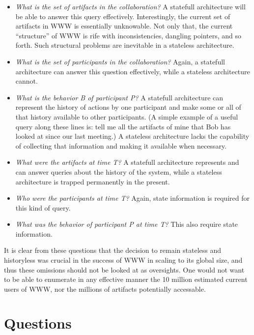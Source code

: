 \begin{itemize}
\item {\em What is the set of artifacts in the collaboration?}  A statefull
  architecture will be able to answer this query effectively.  Interestingly,
  the current set of artifacts in WWW is essentially unknowable. Not only
  that, the current ``structure'' of WWW is rife with inconsistencies,
  dangling pointers, and so forth.  Such structural problems are inevitable
  in a stateless architecture.

\item {\em What is the set of participants in the collaboration?}  Again,
  a statefull architecture can answer this question effectively, while a
  stateless architecture cannot.

\item {\em What is the behavior {\em B\/} of participant {\em P\/}?}  A
  statefull architecture can represent the history of actions by one
  participant and make some or all of that history available to other
  participants. (A simple example of a useful query along these lines is:
  tell me all the artifacts of mine that Bob has looked at since our last
  meeting.)  A stateless architecture lacks the capability of collecting
  that information and making it available when necessary.

\item {\em What were the artifacts at time {\em T\/}?} A statefull
  architecture represents and can answer queries about the history of the
  system, while a stateless architecture is trapped permanently in the
  present.

\item {\em Who were the participants at time {\em T\/}?}  Again, state
information is required for this kind of query.

\item {\em What was the behavior of participant {\em P\/} at time {\em T}?}
This also require state information.
\end{itemize}

It is clear from these questions that the decision to remain stateless and
historyless was crucial in the success of WWW in scaling to its global
size, and thus these omissions should not be looked at as oversights.  One
would not want to be able to enumerate in any effective manner the 10
million estimated current users of WWW, nor the millions of artifacts
potentially accessable.  


\section{Questions}

